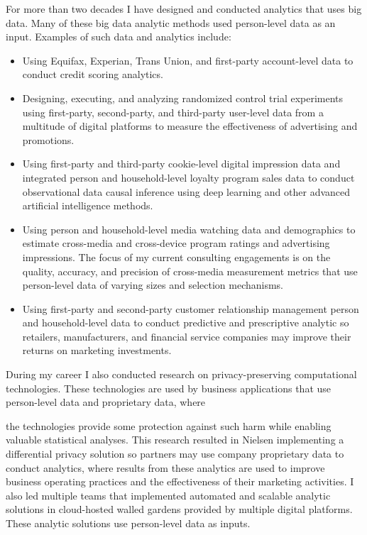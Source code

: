 For more than two decades I have designed and conducted analytics that uses big data.  Many of these big data analytic methods used person-level data as an input.  Examples of such data and analytics include:  
\begin{itemize}
	\item Using Equifax, Experian, Trans Union, and first-party account-level data to conduct credit scoring analytics.
	\item Designing, executing, and analyzing randomized control trial experiments using first-party, second-party, and third-party user-level data from a multitude of digital platforms to measure the effectiveness of  advertising and promotions.
	\item Using first-party and third-party cookie-level digital impression data and integrated person and household-level loyalty program sales data to conduct observational data causal inference using deep learning and other advanced artificial intelligence methods.
	\item Using person and household-level media watching data and demographics to estimate cross-media and cross-device program ratings and advertising  impressions.  The focus of my current consulting engagements is on the quality, accuracy, and precision of cross-media measurement metrics that use person-level data of varying sizes and selection mechanisms.
	\item Using first-party and second-party customer relationship management person and household-level data to conduct predictive and prescriptive analytic so retailers, manufacturers, and financial service companies may improve their returns on marketing investments. 
\end{itemize}

\vspace{2.0ex}

During my career I also conducted research on privacy-preserving computational technologies.  These technologies are used by business applications that use person-level data and proprietary data, where  \\

\newpage

the technologies provide some protection against such harm while enabling valuable statistical analyses.  This research resulted in Nielsen implementing a differential privacy solution so partners may use company proprietary data to conduct analytics, where results from these analytics are used to improve  business operating practices and the effectiveness of their marketing activities.  I also led multiple teams that implemented automated and scalable analytic solutions in cloud-hosted walled gardens provided by multiple digital platforms. These analytic solutions use person-level data as inputs. \\

